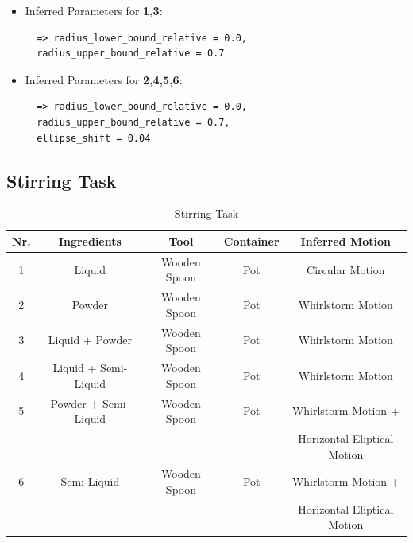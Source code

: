 \begin{itemize}
\item Inferred Parameters for \textbf{1,3}: 
 \begin{lstlisting}
  => radius_lower_bound_relative = 0.0, 
  radius_upper_bound_relative = 0.7
\end{lstlisting}
\item Inferred Parameters for \textbf{2,4,5,6}:
\begin{lstlisting}
  => radius_lower_bound_relative = 0.0, 
  radius_upper_bound_relative = 0.7,
  ellipse_shift = 0.04
\end{lstlisting}
\end{itemize}

\subsection*{Stirring Task}

\begin{table}[H]
  \centering
  \begin{tabular}{|c|c|c|c|c|}
    \hline
    \textbf{Nr.} & \textbf{Ingredients} & \textbf{Tool} & \textbf{Container} & \textbf{Inferred Motion}  \\
    \hline
    1 & Liquid & Wooden Spoon & Pot & Circular Motion \\
    \hline
    2 & Powder & Wooden Spoon & Pot & Whirlstorm Motion\\
    \hline
    3 & Liquid + Powder & Wooden Spoon & Pot & Whirlstorm Motion \\
    \hline
    4 & Liquid + Semi-Liquid & Wooden Spoon & Pot & Whirlstorm Motion \\
    \hline
    5 & Powder + Semi-Liquid & Wooden Spoon & Pot & Whirlstorm Motion +
    \\ & & &  &Horizontal Eliptical Motion \\
    \hline
    6 & Semi-Liquid & Wooden Spoon & Pot & Whirlstorm Motion +
    \\ & & &  &Horizontal Eliptical Motion \\
    \hline
  \end{tabular}
  \caption{Stirring Task}
  \label{tab:mixingtask}
\end{table}

